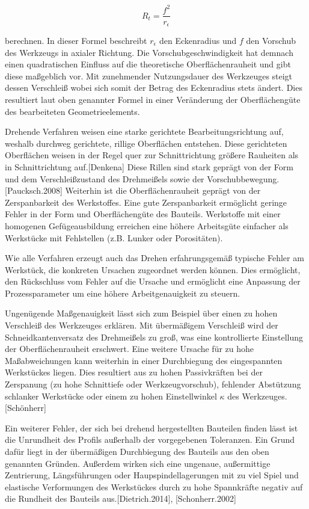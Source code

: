 \begin{equation*}
	R_{t}=\frac{f^{2}}{r_{\epsilon}}
\end{equation*}

berechnen. In dieser Formel beschreibt $r_{\epsilon}$ den Eckenradius und $f$ den Vorschub des Werkzeugs in axialer Richtung. Die Vorschubgeschwindigkeit hat demnach einen quadratischen Einfluss auf die theoretische Oberflächenrauheit und gibt diese maßgeblich vor. Mit zunehmender Nutzungsdauer des Werkzeuges steigt dessen Verschleiß wobei sich somit der Betrag des Eckenradius stets ändert. Dies resultiert laut oben genannter Formel in einer Veränderung der Oberflächengüte des bearbeiteten Geometrieelements. 

Drehende Verfahren weisen eine starke gerichtete Bearbeitungsrichtung auf, weshalb durchweg gerichtete, rillige Oberflächen entstehen. Diese gerichteten Oberflächen weisen in der Regel quer zur Schnittrichtung größere Rauheiten als in Schnittrichtung auf.[Denkena]
Diese Rillen sind stark geprägt von der Form und dem Verschleißzustand des Drehmeißels sowie der Vorschubbewegung. [Paucksch.2008]
Weiterhin ist die Oberflächenrauheit geprägt von der Zerspanbarkeit des Werkstoffes. Eine gute Zerspanbarkeit ermöglicht geringe Fehler in der Form und Oberflächengüte des Bauteils. Werkstoffe mit einer homogenen Gefügeausbildung erreichen eine höhere Arbeitsgüte einfacher als Werkstücke mit Fehlstellen (z.B. Lunker oder Porositäten).

Wie alle Verfahren erzeugt auch das Drehen erfahrungsgemäß typische Fehler am Werkstück, die konkreten Ursachen zugeordnet werden können. Dies ermöglicht, den Rückschluss vom Fehler auf die Ursache und ermöglicht eine Anpassung der Prozessparameter um eine höhere Arbeitgenauigkeit zu steuern. 

Ungenügende Maßgenauigkeit lässt sich zum Beispiel über einen zu hohen Verschleiß des Werkzeuges erklären. Mit übermäßigem Verschleiß wird der Schneidkantenversatz des Drehmeißels zu groß, was eine kontrollierte Einstellung der Oberflächenrauheit erschwert. Eine weitere Ursache für zu hohe Maßabweichungen kann weiterhin in einer Durchbiegung des eingespannten Werkstückes liegen. Dies resultiert aus zu hohen Passivkräften bei der Zerspanung (zu hohe Schnittiefe oder Werkzeugvorschub), fehlender Abstützung schlanker Werkstücke oder einem zu hohen Einstellwinkel $\kappa$ des Werkzeuges. [Schönherr]

Ein weiterer Fehler, der sich bei drehend hergestellten Bauteilen finden lässt ist die Unrundheit des Profils außerhalb der vorgegebenen Toleranzen. Ein Grund dafür liegt in der übermäßigen Durchbiegung des Bauteils aus den oben genannten Gründen. Außerdem wirken sich eine ungenaue, außermittige Zentrierung, Längsführungen oder Haupspindellagerungen mit zu viel Spiel und elastische Verformungen des Werkstückes durch zu hohe Spannkräfte negativ auf die Rundheit des Bauteils aus.[Dietrich.2014], [Schonherr.2002] 

